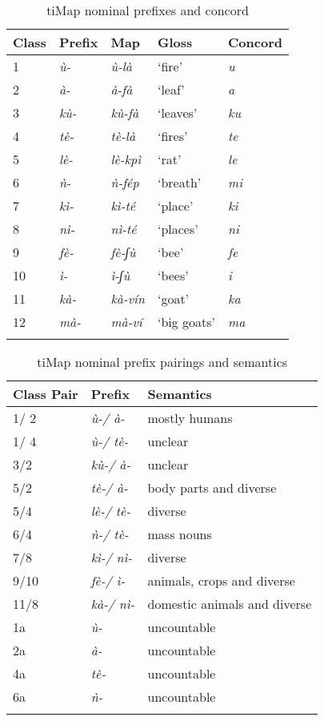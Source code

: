 \documentclass[output=paper]{langsci/langscibook}
\begin{document}
\begin{table}
\caption{\label{tab:kainji:15} tiMap nominal prefixes and concord \citep[156]{Anderson1980}} 
\begin{tabularx}{\textwidth}{XXXXl}
\lsptoprule
{Class}	& {Prefix}	& {Map}	& {Gloss}	& {Concord}\\
\midrule
1	& \textit{ù-}	& \textit{ù-là}	& `fire'	& \textit{u}\\
2	& \textit{à-}	& \textit{à-fà}	& `leaf'	& \textit{a}\\
3	& \textit{kù-}	& \textit{kù-fà}	& `leaves'	& \textit{ku}\\
4	& \textit{tè-}	& \textit{tè-là}	& `fires'	& \textit{te}\\
5	& \textit{lè-}	& \textit{lè-kpì}	& `rat'	& \textit{le}\\
6	& \textit{ǹ-}	& \textit{ǹ-fép}	& `breath'	& \textit{mi}\\
7	& \textit{kì-}	& \textit{kì-té}	& `place'	& \textit{ki}\\
8	& \textit{nì-}	& \textit{nì-té}	& `places'	& \textit{ni}\\
9	& \textit{fè-}	& \textit{fè-ʃù}	& `bee'	& \textit{fe}\\
10	& \textit{ì-}	& \textit{ì-ʃù}	& `bees'	& \textit{i}\\
11	& \textit{kà-}	& \textit{kà-vín}	& `goat'	& \textit{ka}\\
12	& \textit{mà-}	& \textit{mà-ví}	& `big goats'	& \textit{ma}\\
\lspbottomrule
\end{tabularx} 
\end{table}



\begin{table}
\caption{\label{tab:kainji:16} tiMap nominal prefix pairings and semantics}
\begin{tabularx}{\textwidth}{XXl}
\lsptoprule
 {Class Pair}	& {Prefix}	& {Semantics}\\
\midrule
1/ 2	& \textit{ù-/ à-}	& mostly humans\\
1/ 4	& \textit{ù-/ tè-}	& unclear\\
3/2	& \textit{kù-/ à-}	& unclear\\
5/2	& \textit{tè-/ à-}	& body parts and diverse\\
5/4	& \textit{lè-/ tè-}	& diverse\\
6/4	& \textit{ǹ-/ tè-}	& mass nouns\\
7/8	& \textit{kì-/ nì-}	& diverse\\
9/10	& \textit{fè-/ ì-}	& animals, crops and diverse\\
11/8	& \textit{kà-/ nì-}	& domestic animals and diverse\\
1a	& \textit{ù-}	& uncountable\\
2a	& \textit{à-}	& uncountable\\
4a	& \textit{tè-}	& uncountable\\
6a	& \textit{ǹ-}	& uncountable\\
\lspbottomrule
\end{tabularx} 
\end{table}
\end{document}
